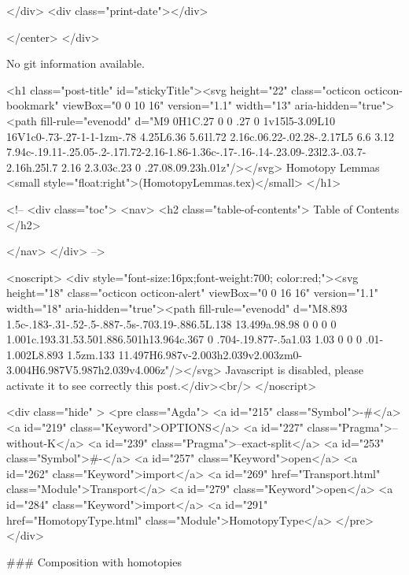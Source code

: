           
        </div>
        <div class="print-date"></div>
        
        
    </center>
  </div>

  
  No git information available.
  

  <h1 class="post-title" id="stickyTitle"><svg height="22" class="octicon octicon-bookmark" viewBox="0 0 10 16" version="1.1" width="13" aria-hidden="true"><path fill-rule="evenodd" d="M9 0H1C.27 0 0 .27 0 1v15l5-3.09L10 16V1c0-.73-.27-1-1-1zm-.78 4.25L6.36 5.61l.72 2.16c.06.22-.02.28-.2.17L5 6.6 3.12 7.94c-.19.11-.25.05-.2-.17l.72-2.16-1.86-1.36c-.17-.16-.14-.23.09-.23l2.3-.03.7-2.16h.25l.7 2.16 2.3.03c.23 0 .27.08.09.23h.01z"/></svg> Homotopy Lemmas <small style="float:right">(HomotopyLemmas.tex)</small>
  </h1>

  <!-- 
  <div class="toc">
    <nav>
    <h2 class="table-of-contents"> Table of Contents </h2>
      

    </nav>
  </div>
   -->

  <noscript>
  <div style="font-size:16px;font-weight:700; color:red;"><svg height="18" class="octicon octicon-alert" viewBox="0 0 16 16" version="1.1" width="18" aria-hidden="true"><path fill-rule="evenodd" d="M8.893 1.5c-.183-.31-.52-.5-.887-.5s-.703.19-.886.5L.138 13.499a.98.98 0 0 0 0 1.001c.193.31.53.501.886.501h13.964c.367 0 .704-.19.877-.5a1.03 1.03 0 0 0 .01-1.002L8.893 1.5zm.133 11.497H6.987v-2.003h2.039v2.003zm0-3.004H6.987V5.987h2.039v4.006z"/></svg> Javascript is disabled, please activate it to see correctly this post.</div><br/>
  </noscript>

  <div class="hide" >
<pre class="Agda">
<a id="215" class="Symbol">{-#</a> <a id="219" class="Keyword">OPTIONS</a> <a id="227" class="Pragma">--without-K</a> <a id="239" class="Pragma">--exact-split</a> <a id="253" class="Symbol">#-}</a>
<a id="257" class="Keyword">open</a> <a id="262" class="Keyword">import</a> <a id="269" href="Transport.html" class="Module">Transport</a>
<a id="279" class="Keyword">open</a> <a id="284" class="Keyword">import</a> <a id="291" href="HomotopyType.html" class="Module">HomotopyType</a>
</pre>
</div>


### Composition with homotopies

